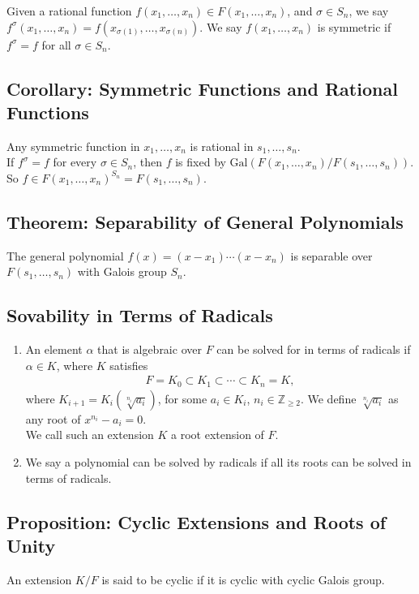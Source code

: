 \documentclass[10pt]{extarticle}
\newcommand{\Z}{\mathbb{Z}}
\begin{document}
  Given a rational function $f(x_1,\dots,x_n)\in F(x_1,\dots,x_n)$, and $\sigma \in S_n$, we say $f^{\sigma}(x_1,\dots,x_n) = f(x_{\sigma(1)},\dots,x_{\sigma(n)})$. We say $f(x_1,\dots,x_n)$ is symmetric if $f^{\sigma} = f$ for all $\sigma \in S_n$.
  \subsection{Corollary: Symmetric Functions and Rational Functions}%
  Any symmetric function in $x_1,\dots,x_n$ is rational in $s_1,\dots,s_n$.\\

  If $f^{\sigma} = f$ for every $\sigma \in S_n$, then $f$ is fixed by $\text{Gal}(F(x_1,\dots,x_n)/F(s_1,\dots,s_n))$.\\

  So $f\in F(x_1,\dots,x_n)^{S_n} = F(s_1,\dots,s_n)$.
  \subsection{Theorem: Separability of General Polynomials}%
  The general polynomial $f(x) = (x-x_1)\cdots(x-x_n)$ is separable over $F(s_1,\dots,s_n)$ with Galois group $S_n$.
  \subsection{Sovability in Terms of Radicals}%
  \begin{enumerate}[(1)]
    \item An element $\alpha$ that is algebraic over $F$ can be solved for in terms of radicals if $\alpha \in K$, where $K$ satisfies
      \begin{align*}
        F = K_{0}\subset K_{1}\subset \cdots \subset K_{n} = K,
      \end{align*}
      where $K_{i+1} = K_i\left(\sqrt[n_i]{a_i}\right)$, for some $a_i\in K_i$, $n_i\in \Z_{\geq 2}$. We define $\sqrt[n_i]{a_i}$ as any root of $x^{n_i}-a_i = 0$.\\

      We call such an extension $K$ a root extension of $F$.
    \item We say a polynomial can be solved by radicals if all its roots can be solved in terms of radicals.
  \end{enumerate}
  \subsection{Proposition: Cyclic Extensions and Roots of Unity}%
  An extension $K/F$ is said to be cyclic if it is cyclic with cyclic Galois group.\\
\end{document}
